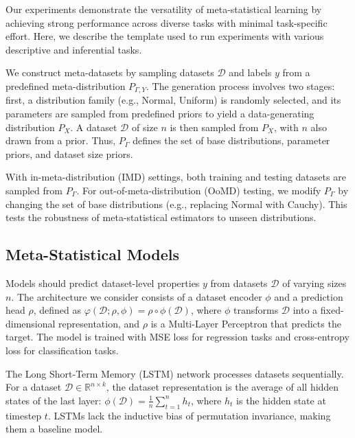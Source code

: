 Our experiments demonstrate the versatility of meta-statistical learning by achieving strong performance across diverse tasks with minimal task-specific effort. Here, we describe the template used to run experiments with various descriptive and inferential tasks.

We construct meta-datasets by sampling datasets \( \mathcal{D} \) and labels \( y \) from a predefined meta-distribution \( P_{\Gamma, Y} \). The generation process involves two stages: first, a distribution family (e.g., Normal, Uniform) is randomly selected, and its parameters are sampled from predefined priors to yield a data-generating distribution \( P_X \). A dataset \( \mathcal{D} \) of size \( n \) is then sampled from \( P_X \), with \( n \) also drawn from a prior. Thus, \( P_{\Gamma} \) defines the set of base distributions, parameter priors, and dataset size priors. 

With in-meta-distribution (IMD) settings, both training and testing datasets are sampled from \( P_{\Gamma} \). For out-of-meta-distribution (OoMD) testing, we modify \( P_{\Gamma} \) by changing the set of base distributions (e.g., replacing Normal with Cauchy). This tests the robustness of meta-statistical estimators to unseen distributions.

\subsection{Meta-Statistical Models}
Models should predict dataset-level properties \( y \) from datasets \( \mathcal{D} \) of varying sizes \( n \). The architecture we consider consists of a dataset encoder \( \phi \) and a prediction head \( \rho \), defined as \( \varphi(\mathcal{D}; \rho, \phi) = \rho \circ \phi(\mathcal{D}) \), where \( \phi \) transforms \( \mathcal{D} \) into a fixed-dimensional representation, and \( \rho \) is a Multi-Layer Perceptron that predicts the target. The model is trained with MSE loss for regression tasks and cross-entropy loss for classification tasks.

The Long Short-Term Memory (LSTM) network \cite{hochreiter1997long} processes datasets sequentially. For a dataset \( \mathcal{D} \in \mathbb{R}^{n \times k} \), the dataset representation is the average of all hidden states of the last layer: \( \phi(\mathcal{D}) = \frac{1}{n} \sum_{t=1}^n h_t \), where \( h_t \) is the hidden state at timestep \( t \). LSTMs lack the inductive bias of permutation invariance, making them a baseline model.

